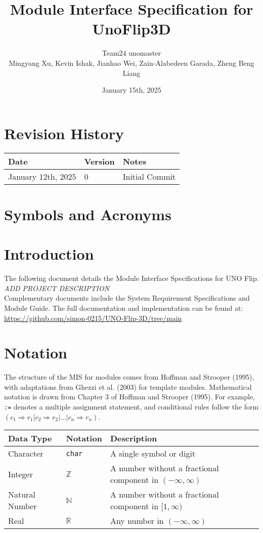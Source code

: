 \documentclass{article}
\title{Module Interface Specification for UnoFlip3D}
\author{Team24 unomaster \\ Mingyang Xu, Kevin Ishak, Jianhao Wei, Zain-Alabedeen Garada, Zheng Beng Liang}
\date{January 15th, 2025}
\begin{document}
\maketitle

\tableofcontents

\newpage

\section{Revision History}
\begin{longtable}{|l|l|l|}
\hline
\textbf{Date} & \textbf{Version} & \textbf{Notes} \\
\hline
January 12th, 2025 & 0 & Initial Commit \\
\hline
\end{longtable}

\section{Symbols and Acronyms}

\section{Introduction}
The following document details the Module Interface Specifications for UNO Flip. \\ 
\textit{ADD PROJECT DESCRIPTION} \\ 
Complementary documents include the System Requirement Specifications and Module Guide. The full documentation and implementation can be found at: 
\url{https://github.com/simon-0215/UNO-Flip-3D/tree/main}

\section{Notation}
The structure of the MIS for modules comes from Hoffman and Strooper (1995), with adaptations from Ghezzi et al. (2003) for template modules. Mathematical notation is drawn from Chapter 3 of Hoffman and Strooper (1995). For example, \texttt{:=} denotes a multiple assignment statement, and conditional rules follow the form \((c_1 \Rightarrow r_1 | c_2 \Rightarrow r_2 | \dots | c_n \Rightarrow r_n)\).

\begin{longtable}{|l|l|p{8cm}|}
\hline
\textbf{Data Type} & \textbf{Notation} & \textbf{Description} \\
\hline
Character & \texttt{char} & A single symbol or digit \\
\hline
Integer & \(\mathbb{Z}\) & A number without a fractional component in \((-\infty, \infty)\) \\
\hline
Natural Number & \(\mathbb{N}\) & A number without a fractional component in \([1, \infty)\) \\
\hline
Real & \(\mathbb{R}\) & Any number in \((-\infty, \infty)\) \\
\hline
\end{longtable}
\end{document}
